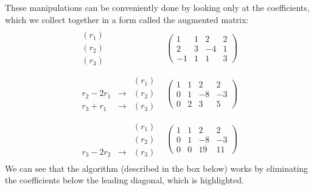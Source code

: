 \documentclass[letterpaper,10pt,english]{jupyterBook}
\begin{document}
\sphinxAtStartPar
These manipulations can be conveniently done by looking only at the coefficients, which we collect together in a form called the augmented matrix:
\begin{equation*}
\begin{split}
\begin{array}{rc}
\begin{array}{r}
 (r_1)\\
 (r_2)\\
 (r_3)
\end{array}
&
\left(
\begin{array}{ccc|c}
\boxed{1} & 1 & 2 & 2 \\
2 & \boxed{3} & -4 & 1 \\
-1 & 1 & \boxed{1} & 3
\end{array}
\right)\\ \\
\begin{array}{ccr}
 & & (r_1)\\
r_2-2r_1 & \longrightarrow & (r_2) \\
r_3+r_1 & \longrightarrow & (r_3)
\end{array}
&
\left(
\begin{array}{ccc|c}
\boxed{1} & 1 & 2 & 2 \\
0 & \boxed{1} & -8 & -3 \\
0 & 2 & \boxed{3} & 5
\end{array}
\right) \\ \\
\begin{array}{ccr}
 & & (r_1)\\
& & (r_2) \\
r_3-2r_2 & \longrightarrow & (r_3)
\end{array}
&
\left(
\begin{array}{ccc|c}
\boxed{1} & 1 & 2 & 2 \\
0 & \boxed{1} & -8 & -3 \\
0 & 0 & \boxed{19} & 11
\end{array}
\right)
\end{array}
\end{split}
\end{equation*}
\sphinxAtStartPar
We can see that the algorithm (described in the box below) works by eliminating the coefficients below the leading diagonal, which is highlighted.
\end{document}
